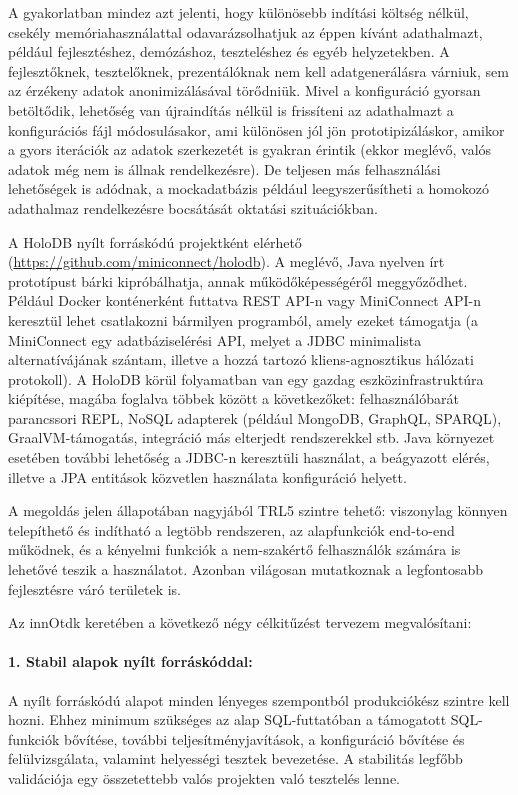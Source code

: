 \documentclass[12pt]{article}
\begin{document}
A gyakorlatban mindez azt jelenti, hogy különösebb indítási költség nélkül, csekély memóriahasználattal odavarázsolhatjuk az éppen kívánt adathalmazt, például fejlesztéshez, demózáshoz, teszteléshez és egyéb helyzetekben.
A fejlesztőknek, tesztelőknek, prezentálóknak nem kell adatgenerálásra várniuk, sem az érzékeny adatok anonimizálásával törődniük.
Mivel a konfiguráció gyorsan betöltődik, lehetőség van újraindítás nélkül is frissíteni az adathalmazt a konfigurációs fájl módosulásakor, ami különösen jól jön prototipizáláskor, amikor a gyors iterációk az adatok szerkezetét is gyakran érintik (ekkor meglévő, valós adatok még nem is állnak rendelkezésre).
De teljesen más felhasználási lehetőségek is adódnak, a mockadatbázis például leegyszerűsítheti a homokozó adathalmaz rendelkezésre bocsátását oktatási szituációkban.

A HoloDB nyílt forráskódú projektként elérhető ({\small \url{https://github.com/miniconnect/holodb}}).
A meglévő, Java nyelven írt prototípust bárki kipróbálhatja, annak működőképességéről meggyőződhet.
Például Docker konténerként futtatva REST API-n vagy MiniConnect API-n keresztül lehet csatlakozni bármilyen programból, amely ezeket támogatja
(a MiniConnect egy adatbáziselérési API, melyet a JDBC minimalista alternatívájának szántam, illetve a hozzá tartozó kliens-agnosztikus hálózati protokoll).
A HoloDB körül folyamatban van egy gazdag eszközinfrastruktúra kiépítése, magába foglalva többek között a következőket: felhasználóbarát parancssori REPL, NoSQL adapterek (például MongoDB, GraphQL, SPARQL), GraalVM-támogatás, integráció más elterjedt rendszerekkel stb.
Java környezet esetében további lehetőség a JDBC-n keresztüli használat,
a beágyazott elérés, illetve a JPA entitások közvetlen használata konfiguráció helyett.

A megoldás jelen állapotában nagyjából TRL5 szintre tehető:
viszonylag könnyen telepíthető és indítható a legtöbb rendszeren,
az alapfunkciók end-to-end működnek,
és a kényelmi funkciók a nem-szakértő felhasználók számára is lehetővé teszik a használatot.
Azonban világosan mutatkoznak a legfontosabb fejlesztésre váró területek is.

Az innOtdk keretében a következő négy célkitűzést tervezem megvalósítani:

\paragraph{1. Stabil alapok nyílt forráskóddal:}
A nyílt forráskódú alapot minden lényeges szempontból produkciókész szintre kell hozni.
Ehhez minimum szükséges az alap SQL-futtatóban a támogatott SQL-funkciók bővítése,
további teljesítményjavítások,
a konfiguráció bővítése és felülvizsgálata,
valamint helyességi tesztek bevezetése.
A stabilitás legfőbb validációja egy összetettebb valós projekten való tesztelés lenne.
\end{document}
